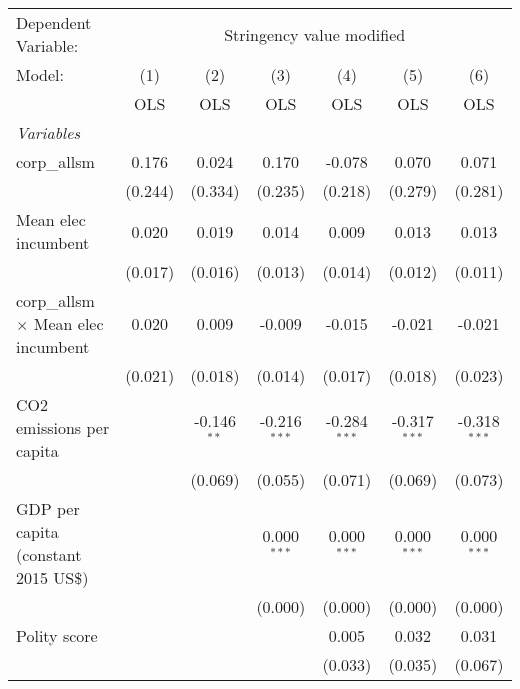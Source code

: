 
\begingroup
\centering
\begin{tabular}{lcccccc}
   \toprule
   Dependent Variable: & \multicolumn{6}{c}{Stringency value modified}\\
   Model:                                     & (1)     & (2)           & (3)            & (4)            & (5)            & (6)\\  
                                              &  OLS    & OLS           & OLS            & OLS            & OLS            & OLS\\  
   \midrule
   \emph{Variables}\\
   corp\_allsm                                & 0.176   & 0.024         & 0.170          & -0.078         & 0.070          & 0.071\\   
                                              & (0.244) & (0.334)       & (0.235)        & (0.218)        & (0.279)        & (0.281)\\   
   Mean elec incumbent                        & 0.020   & 0.019         & 0.014          & 0.009          & 0.013          & 0.013\\   
                                              & (0.017) & (0.016)       & (0.013)        & (0.014)        & (0.012)        & (0.011)\\   
   corp\_allsm $\times$ Mean elec incumbent   & 0.020   & 0.009         & -0.009         & -0.015         & -0.021         & -0.021\\   
                                              & (0.021) & (0.018)       & (0.014)        & (0.017)        & (0.018)        & (0.023)\\   
   CO2 emissions per capita                   &         & -0.146$^{**}$ & -0.216$^{***}$ & -0.284$^{***}$ & -0.317$^{***}$ & -0.318$^{***}$\\   
                                              &         & (0.069)       & (0.055)        & (0.071)        & (0.069)        & (0.073)\\   
   GDP per capita (constant 2015 US\$)        &         &               & 0.000$^{***}$  & 0.000$^{***}$  & 0.000$^{***}$  & 0.000$^{***}$\\   
                                              &         &               & (0.000)        & (0.000)        & (0.000)        & (0.000)\\   
   Polity score                               &         &               &                & 0.005          & 0.032          & 0.031\\   
                                              &         &               &                & (0.033)        & (0.035)        & (0.067)\\   

\end{tabular}
